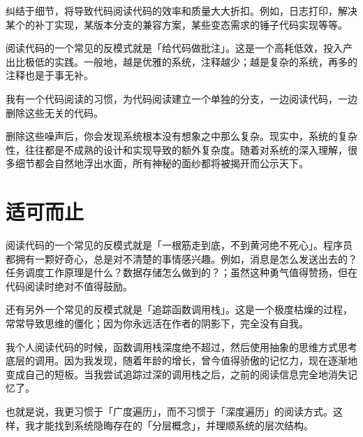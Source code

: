 \begin{content}

纠结于细节，将导致代码阅读代码的效率和质量大大折扣。例如，日志打印，解决某个的补丁实现，某版本分支的兼容方案，某些变态需求的锤子代码实现等等。

阅读代码的一个常见的反模式就是「给代码做批注」。这是一个高耗低效，投入产出比极低的实践。一般地，越是优雅的系统，注释越少；越是复杂的系统，再多的注释也是于事无补。

我有一个代码阅读的习惯，为代码阅读建立一个单独的分支，一边阅读代码，一边删除这些无关的代码。

\begin{leftbar}
\end{leftbar}

删除这些噪声后，你会发现系统根本没有想象之中那么复杂。现实中，系统的复杂性，往往都是不成熟的设计和实现导致的额外复杂度。随着对系统的深入理解，很多细节都会自然地浮出水面，所有神秘的面纱都将被揭开而公示天下。

\end{content}

\section{适可而止}

\begin{content}

阅读代码的一个常见的反模式就是「一根筋走到底，不到黄河绝不死心」。程序员都拥有一颗好奇心，总是对不清楚的事情感兴趣。例如，消息是怎么发送出去的？任务调度工作原理是什么？数据存储怎么做到的？；虽然这种勇气值得赞扬，但在代码阅读时绝对不值得鼓励。

还有另外一个常见的反模式就是「追踪函数调用栈」。这是一个极度枯燥的过程，常常导致思维的僵化；因为你永远活在作者的阴影下，完全没有自我。

我个人阅读代码的时候，函数调用栈深度绝不超过，然后使用抽象的思维方式思考底层的调用。因为我发现，随着年龄的增长，曾今值得骄傲的记忆力，现在逐渐地变成自己的短板。当我尝试追踪过深的调用栈之后，之前的阅读信息完全地消失记忆了。

也就是说，我更习惯于「广度遍历」，而不习惯于「深度遍历」的阅读方式。这样，我才能找到系统隐晦存在的「分层概念」，并理顺系统的层次结构。

\end{content}

